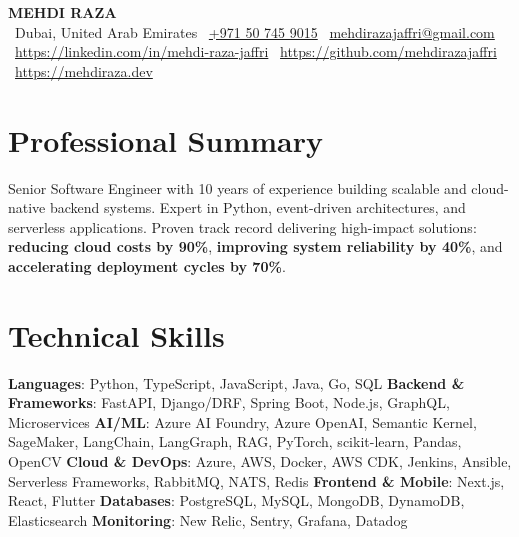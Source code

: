 \documentclass[a4paper,11pt]{article}
\begin{document}
\begin{center}
    {\Huge \textbf{MEHDI RAZA}}\\[0.3em]
    \vspace{0.2em}
    \color{darkgray}
    \faMapMarker*~Dubai, United Arab Emirates \quad
    \faPhone~\href{tel:+971507459015}{+971 50 745 9015} \quad 
    \faEnvelope~\href{mailto:mehdirazajaffri@gmail.com}{mehdirazajaffri@gmail.com}\\[0.3em]
    \faLinkedin~\href{https://linkedin.com/in/mehdi-raza-jaffri}{https://linkedin.com/in/mehdi-raza-jaffri} \quad 
    \faGithub~\href{https://github.com/mehdirazajaffri}{https://github.com/mehdirazajaffri} \quad 
    \faGlobe~\href{https://mehdiraza.dev}{https://mehdiraza.dev}\\[0.3em]
\end{center}


\section*{Professional Summary}
Senior Software Engineer with 10 years of experience building scalable and cloud-native backend systems. Expert in Python, event-driven architectures, and serverless applications. Proven track record delivering high-impact solutions: \textbf{reducing cloud costs by 90\%}, \textbf{improving system reliability by 40\%}, and \textbf{accelerating deployment cycles by 70\%}.


\section*{Technical Skills}

\textbf{Languages}: Python, TypeScript, JavaScript, Java, Go, SQL \newline
\textbf{Backend \& Frameworks}: FastAPI, Django/DRF, Spring Boot, Node.js, GraphQL, Microservices \newline
\textbf{AI/ML}: Azure AI Foundry, Azure OpenAI, Semantic Kernel, SageMaker, LangChain, LangGraph, RAG, PyTorch, scikit-learn, Pandas, OpenCV \newline
\textbf{Cloud \& DevOps}: Azure, AWS, Docker, AWS CDK, Jenkins, Ansible, Serverless Frameworks, RabbitMQ, NATS, Redis \newline
\textbf{Frontend \& Mobile}: Next.js, React, Flutter \newline
\textbf{Databases}: PostgreSQL, MySQL, MongoDB, DynamoDB, Elasticsearch \newline
\textbf{Monitoring}: New Relic, Sentry, Grafana, Datadog \newline
\end{document}
